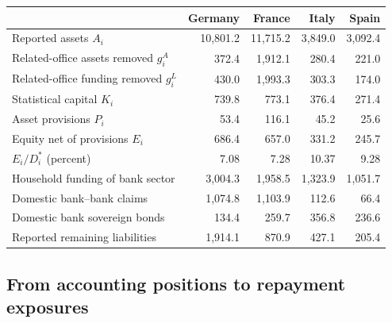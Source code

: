 \begin{table}[H]
\centering
{}
\label{tab:residence-accounting}

\small
\renewcommand{\arraystretch}{1.12}
\begin{tabular*}{\textwidth}{@{\extracolsep{\fill}}lrrrr@{}}
\toprule
 & Germany & France & Italy & Spain \\
\midrule
Reported assets $A_i$ & 10,801.2 & 11,715.2 & 3,849.0 & 3,092.4 \\
Related-office assets removed $g_i^A$ & 372.4 & 1,912.1 & 280.4 & 221.0 \\
Related-office funding removed $g_i^L$ & 430.0 & 1,993.3 & 303.3 & 174.0 \\
Statistical capital $K_i$ & 739.8 & 773.1 & 376.4 & 271.4 \\
Asset provisions $P_i$ & 53.4 & 116.1 & 45.2 & 25.6 \\
Equity net of provisions $E_i$ & 686.4 & 657.0 & 331.2 & 245.7 \\
$E_i/D_i^*$ (percent) & 7.08 & 7.28 & 10.37 & 9.28 \\
\addlinespace
Household funding of bank sector & 3,004.3 & 1,958.5 & 1,323.9 & 1,051.7 \\
Domestic bank--bank claims & 1,074.8 & 1,103.9 & 112.6 & 66.4 \\
Domestic bank sovereign bonds & 134.4 & 259.7 & 356.8 & 236.6 \\
Reported remaining liabilities & 1,914.1 & 870.9 & 427.1 & 205.4 \\
\bottomrule
\end{tabular*}

\end{table}

\subsection{From accounting positions to repayment exposures}

